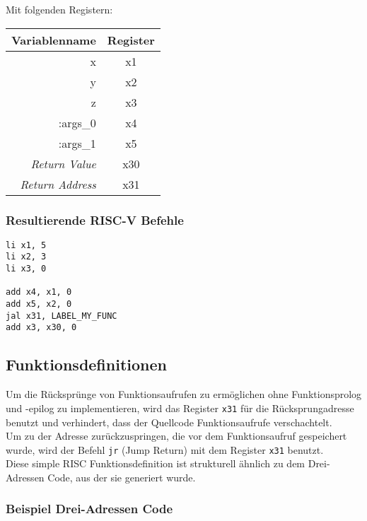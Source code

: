 Mit folgenden Registern:

\begin{table}[H]
  \begin{center}
    \begin{tabular}{| r | c |}
      \hline
      Variablenname & Register \\
      \hline
      x & x1 \\
      y & x2 \\
      z & x3 \\
      :args\_0 & x4 \\
      :args\_1 & x5 \\
      \textit{Return Value} & x30 \\
      \textit{Return Address} & x31 \\
      \hline
    \end{tabular}
  \end{center}
\end{table}

\subsubsection{Resultierende RISC-V Befehle}

\begin{lstlisting}
li x1, 5
li x2, 3
li x3, 0

add x4, x1, 0
add x5, x2, 0
jal x31, LABEL_MY_FUNC
add x3, x30, 0

\end{lstlisting}

\subsection{Funktionsdefinitionen}

Um die Rücksprünge von Funktionsaufrufen zu ermöglichen ohne Funktionsprolog und -epilog zu implementieren, wird das Register \texttt{x31} für die Rücksprungadresse benutzt und verhindert, dass der Quellcode Funktionsaufrufe verschachtelt.\\
Um zu der Adresse zurückzuspringen, die vor dem Funktionsaufruf gespeichert wurde, wird der Befehl \texttt{jr} (Jump Return) mit dem Register \texttt{x31} benutzt\cite{waterman:2017}.\\
Diese simple RISC Funktionsdefinition ist strukturell ähnlich zu dem Drei-Adressen Code, aus der sie generiert wurde.

\subsubsection{Beispiel Drei-Adressen Code}

